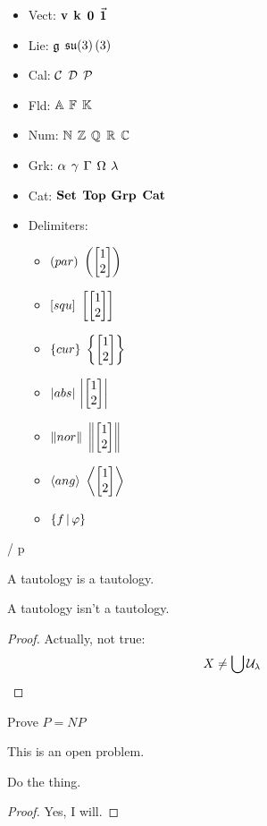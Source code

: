 \documentclass[11pt]{article}
\begin{document}
\mkPsetTitle{}

\useHappyQED

\begin{itemize}
    \item Vect: $\mathbf{v}$ $\mathbf{k}$ $\mathbf{0}$ $\vec{\mathbf{1}}$
    \item Lie: $\mathfrak{g}$ $\mathfrak{s}\mathfrak{u}(3)\left(3\right)$
    \item Cal: $\mathcal{C}$ $\mathcal{D}$ $\mathcal{P}$
    \item Fld: $\mathbb{A}$ $\mathbb{F}$ $\mathbb{K}$
    \item Num: $\mathbb{N}$ $\mathbb{Z}$ $\mathbb{Q}$ $\mathbb{R}$ $\mathbb{C}$
    \item Grk: $\alpha$ $\gamma$ $\Gamma$ $\Omega$ $\lambda$
    \item Cat: $\mathbf{Set}$ $\mathbf{Top}$ $\mathbf{Grp}$ $\mathbf{Cat}$
    \item Delimiters:
    \begin{itemize}
        \newcommand{\tallthing}{\begin{bmatrix}1\\2\end{bmatrix}}
        \item $\left(par\right)$ $\Par{\tallthing}$
        \item $\left[squ\right]$ $\Squ{\tallthing}$
        \item $\left\{cur\right\}$ $\Cur{\tallthing}$
        \item $\left|abs\right|$ $\Abs{\tallthing}$ 
        \item $\left\Vert nor\right\Vert$ $\Nor{\tallthing}$
        \item $\left\langle ang\right\rangle$ $\Ang{\tallthing}$
        \item $\left\{f\,\middle|\,\varphi\right\}$
    \end{itemize}
\end{itemize}

\begin{center}
     \into \tp{\ae} / \blank p
\end{center}

\begin{thm}
    A tautology is a tautology.    
\end{thm}

\begin{thm*}
    A tautology isn't a tautology.    
\end{thm*}
\begin{proof}
    Actually, not true:
    \[
        X \neq \bigcup \mathcal{U}_\lambda
    \]
\end{proof}

\begin{exercise}
    Prove $P = NP$
\end{exercise}
\begin{solution}
    This is an open problem.
\end{solution}


\begin{psetProblem}
    Do the thing.
    \begin{proof}
        Yes, I will.
    \end{proof}
\end{psetProblem}
\end{document}
